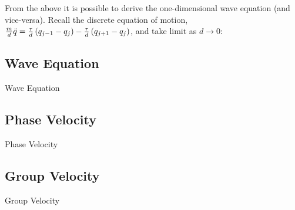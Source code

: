 From the above it is possible to derive the one-dimensional wave equation (and vice-versa). Recall the discrete equation of motion, $\frac{m}{d}\ddot{q}=\frac{\tau}{d}\left(q_{j-1} - q_j\right)-\frac{\tau}{d}\left(q_{j+1} - q_j\right)$, and take limit as $d \to 0$:

\subsection{Wave Equation}
Wave Equation

\subsection{Phase Velocity}
Phase Velocity

\subsection{Group Velocity}
Group Velocity



